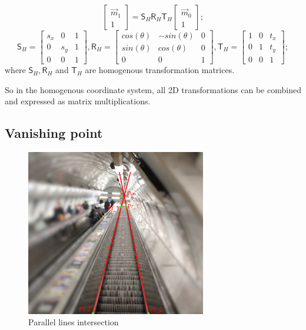 \begin{equation}
    \begin{bmatrix} \vec{m}_1 \\ 1 \end{bmatrix} = 
    \pmb{\mathsf{S}}_H \pmb{\mathsf{R}}_H \pmb{\mathsf{T}}_H
    \begin{bmatrix} \vec{m}_0 \\ 1 \end{bmatrix} ;
\end{equation}
\begin{equation}
    \pmb{\mathsf{S}}_H = \begin{bmatrix} s_x & 0 & 1\\ 0 & s_y & 1 \\ 0 & 0 & 1\end{bmatrix}, \pmb{\mathsf{R}}_H = \begin{bmatrix} cos(\theta) & -sin(\theta) & 0 \\ sin(\theta) & cos(\theta) & 0 \\ 0 & 0 & 1 \end{bmatrix}, \pmb{\mathsf{T}}_H = \begin{bmatrix} 1 & 0 & t_x\\ 0 & 1 & t_y \\ 0 & 0 & 1 \end{bmatrix} ;
\end{equation}
where $\pmb{\mathsf{S}}_H, \pmb{\mathsf{R}}_H$ and $\pmb{\mathsf{T}}_H$ are homogenous transformation matrices.

So in the homogenous coordinate system, all 2D transformations can be combined and expressed as matrix multiplications.

\subsection{Vanishing point}
\begin{figure}[h]
    \centering
    \includegraphics[width=0.7\textwidth]{graphics/parallel_intersection.jpg}
    \caption{Parallel lines intersection}
    \label{fig:intersection_parallel}
\end{figure}

